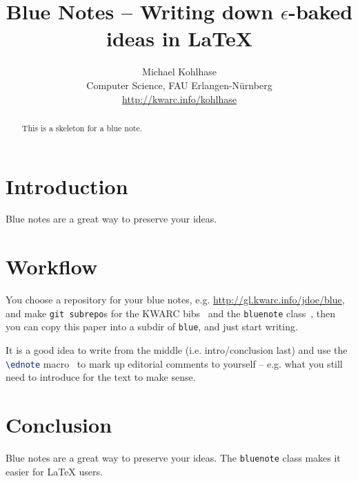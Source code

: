 \documentclass{bluenote}
\title{Blue Notes -- Writing down $\epsilon$-baked ideas in {\LaTeX}}
\author{Michael Kohlhase\\
  Computer Science, FAU Erlangen-N\"urnberg\\
  \url{http://kwarc.info/kohlhase}}
\begin{document}
\maketitle
\begin{abstract}
  This is a skeleton for a blue note.
\end{abstract}

\section{Introduction}\label{sec:intro}

Blue notes are a great way to preserve your ideas. 

\section{Workflow}\label{sec:main}

You choose a repository for your blue notes, e.g. \url{http://gl.kwarc.info/jdoe/blue},
and make \lstinline|git subrepo|s for the KWARC bibs~\cite{KBibs:on} and the
\lstinline|bluenote| class~\cite{BlueNote:on}, then you can copy this paper into a subdir
of \lstinline|blue|, and just start writing. 

It is a good idea to write from the middle (i.e. intro/conclusion last) and use the
\lstinline[language=TeX]|\ednote| macro~\cite{ed:on} to mark up editorial comments to
yourself -- e.g. what you still need to introduce for the text to make sense.

\section{Conclusion}\label{sec:concl}

Blue notes are a great way to preserve your ideas. The \lstinline|bluenote| class makes it
easier for {\LaTeX} users. 

\begin{sloppypar}
\printbibliography
\end{sloppypar}
\end{document}
